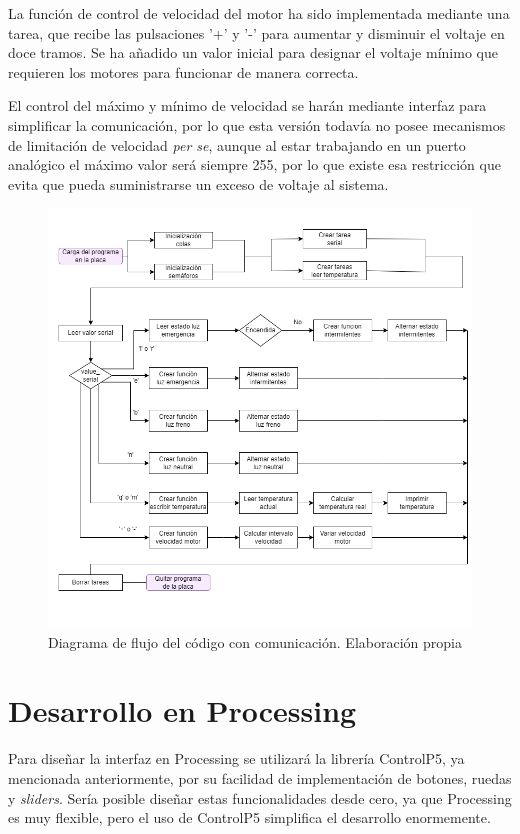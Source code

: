 La función de control de velocidad del motor ha sido implementada mediante una tarea, que recibe las pulsaciones '+' y '-' para aumentar y disminuir el voltaje en doce tramos. Se ha añadido un valor inicial para designar el voltaje mínimo que requieren los motores para funcionar de manera correcta. 

El control del máximo y mínimo de velocidad se harán mediante interfaz para simplificar la comunicación, por lo que esta versión todavía no posee mecanismos de limitación de velocidad \textit{per se}, aunque al estar trabajando en un puerto analógico el máximo valor será siempre 255, por lo que existe esa restricción que evita que pueda suministrarse un exceso de voltaje al sistema. 

\begin{figure}[H]
    \centering
    \includegraphics[width=1\textwidth]{imagenes/diagramas/Diagrama_FREERTOS.png}
    \caption{Diagrama de flujo del código con comunicación. Elaboración propia}
\end{figure}


\section{Desarrollo en Processing}

Para diseñar la interfaz en Processing se utilizará la librería ControlP5, ya mencionada anteriormente, por su facilidad de implementación de botones, ruedas y \textit{sliders}. Sería posible diseñar estas funcionalidades desde cero, ya que Processing es muy flexible, pero el uso de ControlP5 simplifica el desarrollo enormemente. 

